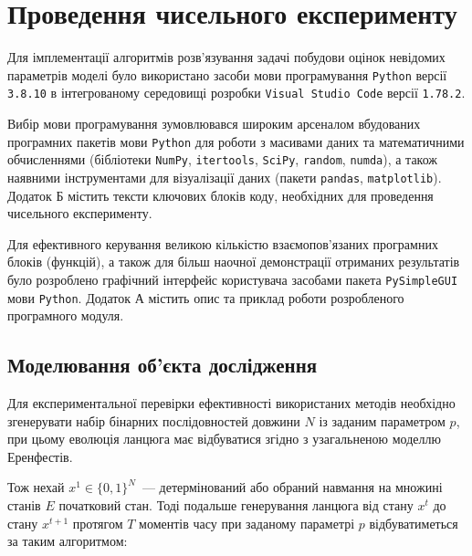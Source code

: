 
\chapter{Проведення чисельного експерименту}
\label{chap: practice}

Для імплементації алгоритмів розв’язування задачі побудови оцінок невідомих параметрів моделі було використано засоби мови програмування \texttt{Python} версії \texttt{3.8.10} в інтегрованому середовищі розробки \texttt{Visual Studio Code} версії \texttt{1.78.2}.

Вибір мови програмування зумовлювався широким арсеналом вбудованих програмних пакетів мови \texttt{Python} для роботи з масивами даних та математичними обчисленнями (бібліотеки \texttt{NumPy}, \texttt{itertools}, \texttt{SciPy}, \texttt{random}, \texttt{numda}), а також наявними інструментами для візуалізації даних (пакети \texttt{pandas}, \texttt{matplotlib}). Додаток Б містить тексти ключових блоків коду, необхідних для проведення чисельного експерименту.

Для ефективного керування великою кількістю взаємопов'язаних програмних блоків (функцій), а також для більш наочної демонстрації отриманих результатів було розроблено графічний інтерфейс користувача засобами пакета \texttt{PySimpleGUI} мови \texttt{Python}. Додаток А містить опис та приклад роботи розробленого програмного модуля.

\section{Моделювання об'єкта дослідження}
\label{chap: modeling}

Для експериментальної перевірки ефективності використаних методів необхідно згенерувати набір бінарних послідовностей довжини $N$ із заданим параметром $p$, при цьому еволюція ланцюга має відбуватися згідно з узагальненою моделлю Еренфестів.

Тож нехай $x^1 \in \{ 0,1 \}^N$~--- детермінований або обраний навмання на множині станів $E$ початковий стан. Тоді подальше генерування ланцюга від стану $x^t$ до стану $x^{t+1}$ протягом $T$ моментів часу при заданому параметрі $p$ відбуватиметься за таким алгоритмом:

